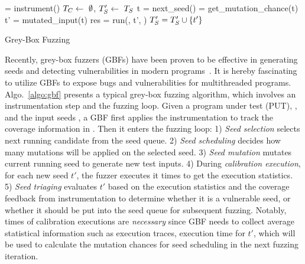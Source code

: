 \setlength{\textfloatsep}{0.1cm} 
\begin{algorithm}[t]
 \small
{}
	\Prog = instrument(\ProgO) 
	$T_{C} \leftarrow~\emptyset$, $T^{\prime}_{S} \leftarrow~T_{S}$\; 
	 {
		t = next\_seed(\FinalSeeds) 
		\mutChance = get\_mutation\_chance(t)  \label{line:algo:energy}
		 {
			t' = mutated\_input(t)  
			res = run(\Prog, t', \Ncal)
			 {\label{line:algo:new_cov}
				$T^{\prime}_{S} = T^{\prime}_{S}\cup\{t'\}$  \label{line:algo:triage_end}
			}
		}
	}
	\caption{Grey-Box Fuzzing}\label{algo:gbf}
\end{algorithm}

Recently, grey-box fuzzers (GBFs) have been proven to be effective in generating seeds and detecting vulnerabilities in modern programs~\cite{fuzz_survey,afl,libfuzzer,Angora}. It is hereby fascinating to utilize GBFs to expose bugs and vulnerabilities for multithreaded programs.
Algo.~\ref{algo:gbf} presents a typical grey-box fuzzing algorithm, which involves an instrumentation step and the fuzzing loop.
Given a program under test (PUT), \ProgO, and the input seeds \Seeds, a GBF first applies the instrumentation to track the coverage information in \ProgO. Then it enters the fuzzing loop:
1) \emph{Seed selection} selects next running candidate from the seed queue. 2) \emph{Seed scheduling} decides how many mutations will be applied on the selected seed. 3) \emph{Seed mutation} mutates current running seed to generate new test inputs. 4) During \emph{calibration execution}, for each new seed $t'$, the fuzzer executes it \Ncal times to get the execution statistics. 5) \emph{Seed triaging} evaluates $t'$  based on the execution statistics and the coverage feedback from instrumentation to determine whether it is a vulnerable seed, or whether it should be put into the seed queue for subsequent fuzzing. Notably, \Ncal times of calibration executions are \emph{necessary} since GBF needs to collect average statistical 
information such as execution traces, execution time for $t'$, which will be used to 
calculate the mutation chances for seed scheduling in the next fuzzing iteration.

